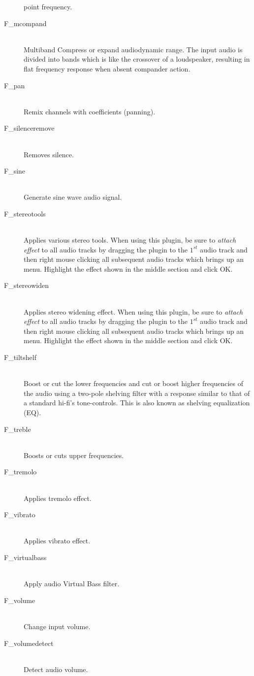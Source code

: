 \begin{description}
  point frequency.
\item [F\_mcompand]~\\Multiband Compress or expand
  audiodynamic range. The input audio is divided into bands which is
  like the crossover of a loudspeaker, resulting in flat frequency
  response when absent compander action.
\item [F\_pan]~\\Remix channels with coefficients (panning).
\item [F\_silenceremove]~\\Removes silence.
\item [F\_sine]~\\Generate sine wave audio signal.
\item [F\_stereotools]~\\Applies various stereo tools. When
  using this plugin, be sure to \textit{attach effect} to all audio
  tracks by dragging the plugin to the $1^{st}$ audio track and then
  right mouse clicking all subsequent audio tracks which brings up an
  menu. Highlight the effect shown in the middle section and click OK.
\item [F\_stereowiden]~\\Applies stereo widening effect. When
  using this plugin, be sure to \textit{attach effect} to all audio
  tracks by dragging the plugin to the $1^{st}$ audio track and then
  right mouse clicking all subsequent audio tracks which brings up an
  menu. Highlight the effect shown in the middle section and click OK.
\item [F\_tiltshelf]~\\Boost or cut the lower frequencies and cut or boost higher frequencies of the audio using a two-pole shelving filter with a response similar to that of a standard hi-fi’s tone-controls. This is also known as shelving equalization (EQ).
\item [F\_treble]~\\Boosts or cuts upper frequencies.
\item [F\_tremolo]~\\Applies tremolo effect.
\item [F\_vibrato]~\\Applies vibrato effect.
\item [F\_virtualbass]~\\Apply audio Virtual Bass filter.
\item [F\_volume]~\\Change input volume.
\item [F\_volumedetect]~\\Detect audio volume.
\end{description}

